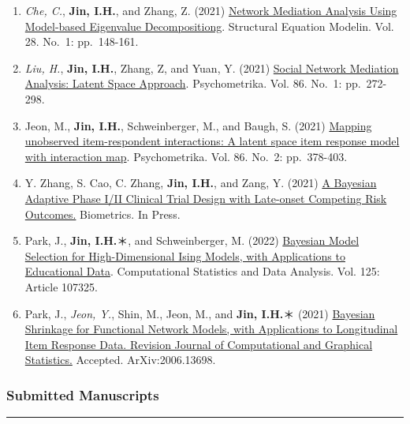 \documentclass[]{book}
\begin{document}
\begin{enumerate}
\item
  \emph{Che, C.}, \textbf{Jin, I.H.}, and Zhang, Z. (2021) \href{https://www.researchgate.net/publication/339371541_Network_Mediation_Analysis_Using_Model-Based_Eigenvalue_Decomposition}{Network Mediation Analysis Using Model-based Eigenvalue Decompositiong}. Structural Equation Modelin. Vol. 28. No.~1: pp.~148-161.
\item
  \emph{Liu, H.}, \textbf{Jin, I.H.}, Zhang, Z, and Yuan, Y. (2021) \href{https://arxiv.org/abs/1810.03751}{Social Network Mediation Analysis: Latent Space Approach}. Psychometrika. Vol. 86. No.~1: pp.~272-298.
\item
  Jeon, M., \textbf{Jin, I.H.}, Schweinberger, M., and Baugh, S. (2021) \href{https://arxiv.org/abs/2007.08719}{Mapping unobserved item-respondent interactions: A latent space item response model with interaction map}. Psychometrika. Vol. 86. No.~2: pp.~378-403.
\item
  Y. Zhang, S. Cao, C. Zhang, \textbf{Jin, I.H.}, and Zang, Y. (2021) \href{https://doi.org/10.1111/biom.13347}{A Bayesian Adaptive Phase I/II Clinical Trial Design with Late-onset Competing Risk Outcomes.} Biometrics. In Press.
\item
  Park, J., \textbf{Jin, I.H.}＊, and Schweinberger, M. (2022) \href{https://arxiv.org/abs/1911.07142}{Bayesian Model Selection for High-Dimensional Ising Models, with Applications to Educational Data}. Computational Statistics and Data Analysis. Vol. 125: Article 107325.
\item
  Park, J., \emph{Jeon, Y.}, Shin, M., Jeon, M., and \textbf{Jin, I.H.}＊ (2021) \href{https://arxiv.org/abs/2006.13698}{Bayesian Shrinkage for Functional Network Models, with Applications to Longitudinal Item Response Data. Revision Journal of Computational and Graphical Statistics.} Accepted. ArXiv:2006.13698.
\end{enumerate}

\hypertarget{submitted-manuscripts}{%
\subsubsection*{Submitted Manuscripts}\label{submitted-manuscripts}}

\begin{center}\rule{0.5\linewidth}{0.5pt}\end{center}
\end{document}
